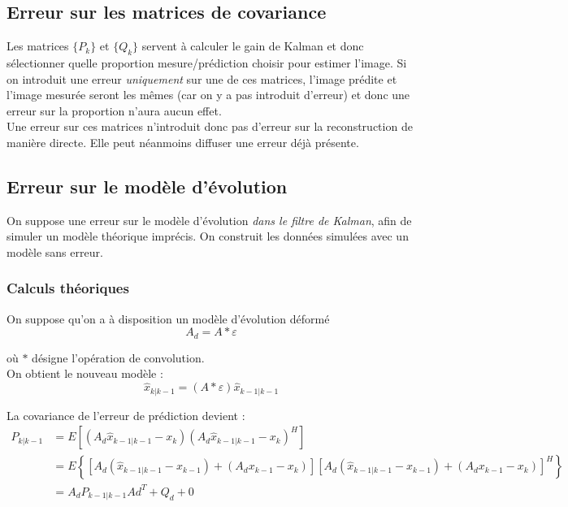 \documentclass[titlepage]{article}
\begin{document}
	\subsection{Erreur sur les matrices de covariance}
	
	Les matrices $\{P_k\}$ et $\{Q_k\}$ servent à calculer le gain de Kalman et donc sélectionner quelle proportion mesure/prédiction choisir pour estimer l'image. Si on introduit une erreur \emph{uniquement} sur une de ces matrices, l'image prédite et l'image mesurée seront les mêmes (car on y a pas introduit d'erreur) et donc une erreur sur la proportion n'aura aucun effet.\\
	Une erreur sur ces matrices n'introduit donc pas d'erreur sur la reconstruction de manière directe. Elle peut néanmoins diffuser une erreur déjà présente.
	
	\subsection{Erreur sur le modèle d'évolution}
	
	On suppose une erreur sur le modèle d'évolution \emph{dans le filtre de Kalman}, afin de simuler un modèle théorique imprécis. On construit les données simulées avec un modèle sans erreur.\\
	
	\subsubsection{Calculs théoriques}
	
	On suppose qu'on a à disposition un modèle d'évolution déformé 
	\begin{equation}
		A_d = A\ast\varepsilon
	\end{equation}
	
	où $\ast$ désigne l'opération de convolution. \\
	On obtient le nouveau modèle :
	\begin{equation}
		\widehat{x}_{k|k-1} = \left(A\ast\varepsilon\right)\widehat{x}_{k-1|k-1}
	\end{equation}

	La covariance de l'erreur de prédiction devient :
	\begin{align*}
		P_{k|k-1} &= E\left[\left(A_d\widehat{x}_{k-1|k-1} - x_k\right)\left(A_d\widehat{x}_{k-1|k-1} - x_k\right)^H\right]\\
		&= E\left\{
			\left[
				A_d(\widehat{x}_{k-1|k-1} - x_{k-1}) + (A_dx_{k-1} - x_k)
			\right]\left[
			A_d(\widehat{x}_{k-1|k-1} - x_{k-1}) + (A_dx_{k-1} - x_k)
			\right]^H
		\right\} \\
		&= A_dP_{k-1|k-1}Ad^T + Q_d + 0
	\end{align*}
	
\end{document}
